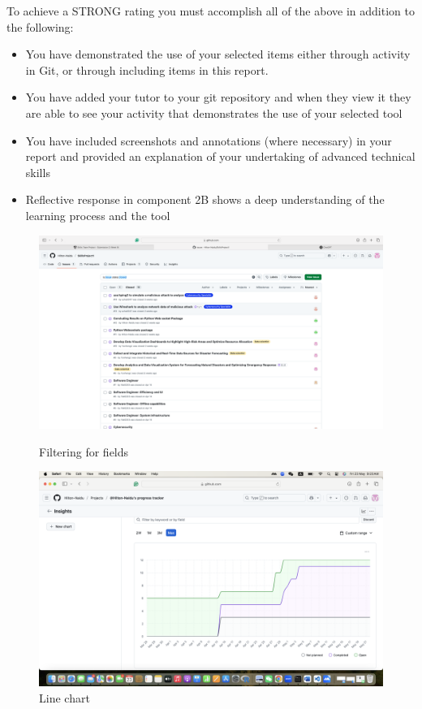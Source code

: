 \documentclass[a4paper, 11pt]{report}
\begin{document}
To achieve a STRONG rating you must accomplish all of the above in addition to the following:
\begin{itemize}
    \item You have demonstrated the use of your selected items either through activity in Git, or through including items in this report.
    \item You have added your tutor to your git repository and when they view it they are able to see your activity that demonstrates the use of your selected tool
    \item You have included screenshots and annotations (where necessary) in your report and provided an explanation of your undertaking of advanced technical skills
    \item Reflective response in component 2B shows a deep understanding of the learning process and the tool
\end{itemize}

\vspace{4ex}
\clearpage

\begin{figure}[htbp]
\centering
\includegraphics[width=0.9\linewidth]{Field filter.png}
\caption{Filtering for fields}
\vspace{1em} %
\includegraphics[width=0.9\linewidth]{LCF.png}
\caption{Line chart}
\end{figure}
\clearpage
\end{document}
